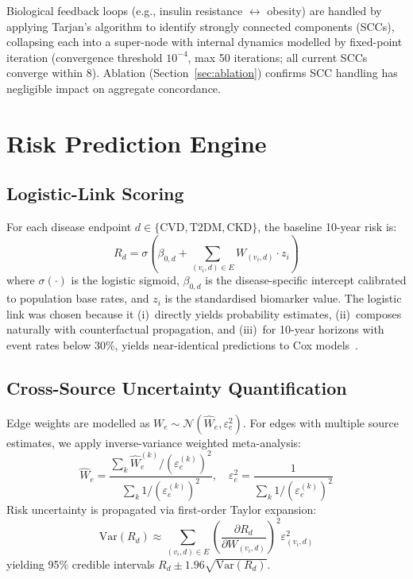 \documentclass[runningheads]{llncs}
\begin{document}
Biological feedback loops (e.g., insulin resistance
$\leftrightarrow$ obesity) are handled by applying Tarjan's algorithm
to identify strongly connected components (SCCs), collapsing each into
a super-node with internal dynamics modelled by fixed-point iteration
(convergence threshold $10^{-4}$, max 50 iterations; all current SCCs
converge within 8).  Ablation (Section~\ref{sec:ablation}) confirms
SCC handling has negligible impact on aggregate concordance.

\section{Risk Prediction Engine}\label{sec:risk}

\subsection{Logistic-Link Scoring}\label{sec:logistic}

For each disease endpoint $d \in \{\text{CVD}, \text{T2DM}, \text{CKD}\}$,
the baseline 10-year risk is:
\begin{equation}\label{eq:risk}
R_d = \sigma\!\left(\beta_{0,d} + \sum_{(v_i, d) \in E} W_{(v_i,d)} \cdot z_i\right)
\end{equation}
where $\sigma(\cdot)$ is the logistic sigmoid, $\beta_{0,d}$ is the
disease-specific intercept calibrated to population base rates, and
$z_i$ is the standardised biomarker value.  The logistic link was
chosen because it (i)~directly yields probability estimates, (ii)~composes
naturally with counterfactual propagation, and (iii)~for 10-year horizons
with event rates below 30\%, yields near-identical predictions to Cox
models~\cite{dagostino2008framingham}.

\subsection{Cross-Source Uncertainty Quantification}\label{sec:uncert}

Edge weights are modelled as $W_e \sim \mathcal{N}(\hat{W}_e,
\varepsilon_e^2)$.  For edges with multiple source estimates, we apply
inverse-variance weighted meta-analysis:
\begin{equation}\label{eq:meta}
\hat{W}_e = \frac{\sum_k \hat{W}_e^{(k)} / (\varepsilon_e^{(k)})^2}
{\sum_k 1 / (\varepsilon_e^{(k)})^2}, \quad
\varepsilon_e^2 = \frac{1}{\sum_k 1 / (\varepsilon_e^{(k)})^2}
\end{equation}
Risk uncertainty is propagated via first-order Taylor expansion:
\begin{equation}\label{eq:riskvar}
\mathrm{Var}(R_d) \approx \sum_{(v_i,d) \in E}
\left(\frac{\partial R_d}{\partial W_{(v_i,d)}}\right)^2 \varepsilon_{(v_i,d)}^2
\end{equation}
yielding 95\% credible intervals $R_d \pm 1.96\sqrt{\mathrm{Var}(R_d)}$.
\end{document}

